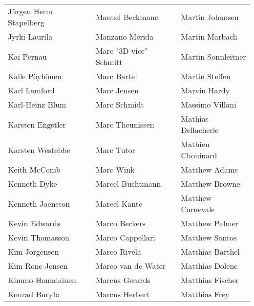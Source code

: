 \begin{tabular}{p{4.5cm}p{4.5cm}p{4.5cm}}
Jürgen Herm Stapelberg & Manuel Beckmann & Martin Johansen \\
Jyrki Laurila & Manzano Mérida & Martin Marbach \\
Kai Pernau & Marc "3D-vice" Schmitt & Martin Sonnleitner \\
Kalle Pöyhönen & Marc Bartel & Martin Steffen \\
Karl Lamford & Marc Jensen & Marvin Hardy \\
Karl-Heinz Blum & Marc Schmidt & Massimo Villani \\
Karsten Engstler & Marc Theunissen & Mathias Dellacherie \\
Karsten Westebbe & Marc Tutor & Mathieu Chouinard \\
Keith McComb & Marc Wink & Matthew Adams \\
Kenneth Dyke & Marcel Buchtmann & Matthew Browne \\
Kenneth Joensson & Marcel Kante & Matthew Carnevale \\
Kevin Edwards & Marco Beckers & Matthew Palmer \\
Kevin Thomasson & Marco Cappellari & Matthew Santos \\
Kim Jorgensen & Marco Rivela & Matthias Barthel \\
Kim Rene Jensen & Marco van de Water & Matthias Dolenc \\
Kimmo Hamalainen & Marcus Gerards & Matthias Fischer \\
Konrad Buryło & Marcus Herbert & Matthias Frey \\
\end{tabular}
\newpage
\setlength{\tabcolsep}{1mm}
